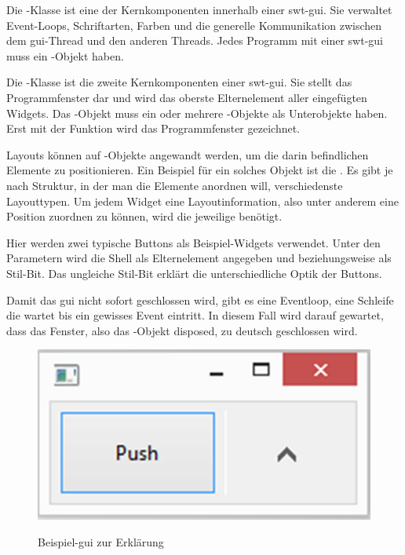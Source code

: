 \begin{description}
    Die -Klasse ist eine der Kernkomponenten innerhalb einer \acrshort{swt}-\acrshort{gui}.
    Sie verwaltet Event-Loops, Schriftarten, Farben und die generelle Kommunikation zwischen dem \acrshort{gui}-Thread
    und den anderen Threads. Jedes Programm mit einer \acrshort{swt}-\acrshort{gui} muss ein -Objekt haben.

    Die -Klasse ist die zweite Kernkomponenten einer \acrshort{swt}-\acrshort{gui}.
    Sie stellt das Programmfenster dar und wird das oberste Elternelement aller eingefügten Widgets.
	Das -Objekt muss ein oder mehrere -Objekte als Unterobjekte haben.
    Erst mit der Funktion  wird das Programmfenster gezeichnet.

    Layouts können auf -Objekte angewandt werden, um die darin befindlichen
	Elemente zu positionieren. Ein Beispiel für ein solches Objekt ist die .
    Es gibt je nach Struktur, in der man die Elemente anordnen will, verschiedenste Layouttypen.
    Um jedem Widget eine Layoutinformation, also unter anderem eine Position zuordnen zu können,
	wird die jeweilige  benötigt.

    Hier werden zwei typische Buttons als Beispiel-Widgets verwendet. Unter den Parametern wird die Shell als
    Elternelement angegeben und  beziehungsweise 
    als Stil-Bit. Das ungleiche Stil-Bit erklärt die unterschiedliche Optik der Buttons.

    Damit das \acrshort{gui} nicht sofort geschlossen wird, gibt es eine Eventloop,
		eine Schleife die wartet bis ein gewisses Event eintritt. In diesem Fall wird
		darauf gewartet, dass das Fenster, also das -Objekt disposed, zu deutsch
		geschlossen wird.

\end{description}

\begin{figure}[htb]
	\centering
	\includegraphics[]{images/erklaerungsgui.png}
	\label{erklaerungsgui}
  \caption{Beispiel-\acrshort{gui} zur Erklärung}
\end{figure}
